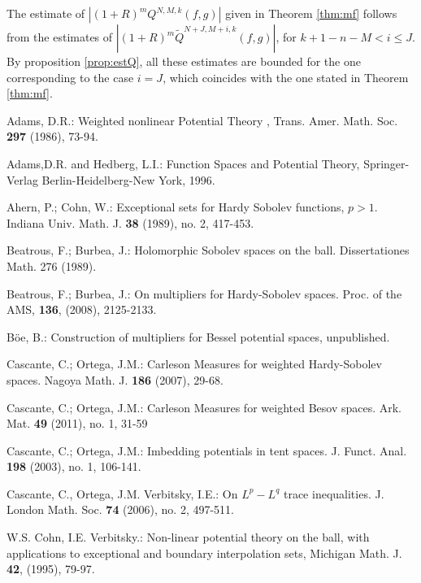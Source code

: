 \documentclass[12pt,twoside,leqno,final]{amsart}
\theoremstyle{plain}
\begin{document}
The estimate of $|(1+R)^m Q^{N,M,k}(f,g)|$ given in Theorem \ref{thm:mf} 
follows from the estimates  of $|(1+R)^m \tilde Q^{N+J,M+i,k}(f,g)|$, for $k+1-n-M<i\le J$. 
By proposition \ref{prop:estQ}, all these estimates are bounded for the one corresponding to the case $i=J$, which coincides with  the one stated in Theorem \ref{thm:mf}.

\begin{thebibliography}{12}
  Adams, D.R.:     
Weighted nonlinear Potential Theory , 
Trans. Amer. Math. Soc.  \textbf{297} (1986), 73-94.

   Adams,D.R. and  Hedberg, L.I.:   
 Function Spaces and Potential Theory, 
 Springer-Verlag Berlin-Heidelberg-New York, 1996.
 
  Ahern, P.; Cohn, W.: 
 Exceptional sets for Hardy Sobolev functions, $p>1$. 
 Indiana Univ. Math. J. \textbf{38} (1989), no. 2, 417-453.
 
 Beatrous, F.; Burbea, J.:
 Holomorphic Sobolev spaces on the ball. 
Dissertationes Math. 276 (1989).

 Beatrous, F.; Burbea, J.: 
On multipliers for Hardy-Sobolev spaces. 
Proc. of the AMS, \textbf{136}, (2008), 2125-2133.

 B\"oe, B.: 
Construction of multipliers for Bessel potential spaces, 
unpublished.

 Cascante, C.;  Ortega, J.M.: 
Carleson Measures for weighted Hardy-Sobolev spaces. 
Nagoya Math. J. \textbf{186} (2007), 29-68.

 Cascante, C.;  Ortega, J.M.: 
Carleson Measures for weighted Besov spaces. 
Ark. Mat. \textbf{49} (2011), no. 1, 31-59

 Cascante, C.;  Ortega, J.M.: 
Imbedding potentials in tent spaces. 
J. Funct. Anal. \textbf{198} (2003), no. 1, 106-141.

  Cascante, C., Ortega, J.M.  Verbitsky, I.E.: 
 On $L^p-L^q$ trace inequalities. 
 J. London Math. Soc. \textbf{74} (2006), no. 2, 497-511.
 
  W.S. Cohn, I.E. Verbitsky.:   
 Non-linear potential theory on the ball, with applications to exceptional and boundary interpolation sets, 
 Michigan Math. J. \textbf{42}, (1995), 79-97.
 

\end{thebibliography}
\end{document}
